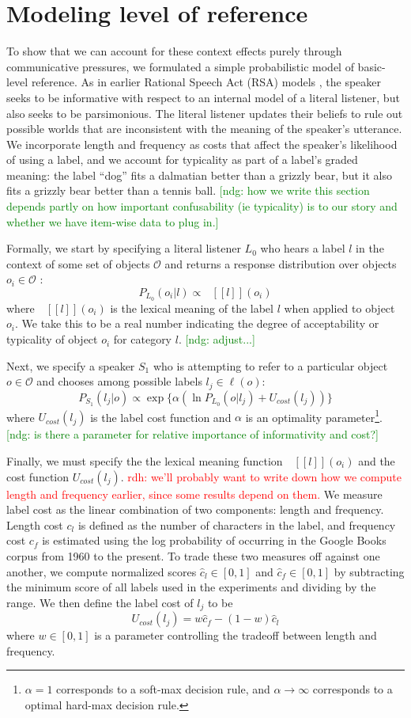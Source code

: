 \documentclass[10pt,letterpaper]{article}
\newcommand{\red}[1]{\textcolor{Red}{#1}}
\newcommand{\ndg}[1]{\textcolor{Green}{[ndg: #1]}}
\newcommand{\denote}[1]{\mbox{ $[\![ #1 ]\!]$}}
\begin{document}
\section{\bf Modeling level of reference}

To show that we can account for these context effects purely through communicative pressures, we formulated a simple probabilistic model of basic-level reference. As in earlier Rational Speech Act (RSA) models \cite{frank2012, goodmanstuhlmueller2013}, the speaker seeks to be informative with respect to an internal model of a literal listener, but also seeks to be parsimonious. The literal listener updates their beliefs to rule out possible worlds that are inconsistent with the meaning of the speaker's utterance. We incorporate length and frequency as costs that affect the speaker's likelihood of using a label, and we account for typicality as part of a label's graded meaning: the label ``dog'' fits a dalmatian better than a grizzly bear, but it also fits a grizzly bear better than a tennis ball.
\ndg{how we write this section depends partly on how important confusability (ie typicality) is to our story and whether we have item-wise data to plug in.}

Formally, we start by specifying a literal listener $L_0$ who hears a label $l$ in the context of some set of objects $\mathcal{O}$ and returns a response distribution over objects $o_i \in \mathcal{O}$ : 
$$P_{L_0}(o_i | l) \propto \denote{l}(o_i)$$
where $\denote{l}(o_i)$ is the lexical meaning of the label $l$ when applied to object $o_i$. We take this to be a real number indicating the degree of acceptability or typicality of object $o_i$ for category $l$. \ndg{adjust...}

Next, we specify a speaker $S_1$ who is attempting to refer to a particular object $o \in \mathcal{O}$ and chooses among possible labels $l_j \in \ell(o)$: 
$$P_{S_1}(l_j | o) \propto \exp\{\alpha \left( \ln P_{L_0}(o | l_j) + U_{cost}(l_j) \right) \}$$
where $U_{cost}(l_j)$ is the label cost function and $\alpha$ is an optimality parameter\footnote{$\alpha = 1$ corresponds to a soft-max decision rule, and $\alpha \rightarrow \infty$ corresponds to a optimal hard-max decision rule.}. \ndg{is there a parameter for relative importance of informativity and cost?}

Finally, we must specify the the lexical meaning function $\denote{l}(o_i)$ and the cost function $U_{cost}(l_j)$. 
\red{rdh: we'll probably want to write down how we compute length and frequency earlier, since some results depend on them.}
We measure label cost as the linear combination of two components: length and frequency. Length cost $c_l$ is defined as the number of characters in the label, and frequency cost $c_f$ is estimated using the log probability of occurring in the Google Books corpus from 1960 to the present. To trade these two measures off against one another, we compute normalized scores $\hat{c}_l \in [0,1]$ and $\hat{c}_f \in [0,1]$ by subtracting the minimum score of all labels used in the experiments and dividing by the range. We then define the label cost of $l_j$ to be $$U_{cost}(l_j) = w\hat{c}_f - (1-w)\hat{c}_l$$ where $w \in [0,1]$ is a parameter controlling the tradeoff between length and frequency.
\end{document}
